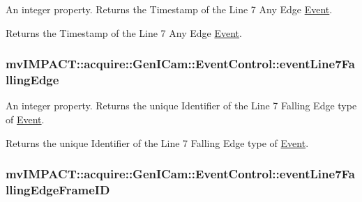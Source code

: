 An integer property. Returns the Timestamp of the Line 7 Any Edge \hyperlink{classmv_i_m_p_a_c_t_1_1acquire_1_1_event}{Event}. 

Returns the Timestamp of the Line 7 Any Edge \hyperlink{classmv_i_m_p_a_c_t_1_1acquire_1_1_event}{Event}. \hypertarget{classmv_i_m_p_a_c_t_1_1acquire_1_1_gen_i_cam_1_1_event_control_a3bbff631927ffcf9f32cb0161540f31b}{
\subsubsection[{event\+Line7\+Falling\+Edge}]{ mv\+I\+M\+P\+A\+C\+T\+::acquire\+::\+Gen\+I\+Cam\+::\+Event\+Control\+::event\+Line7\+Falling\+Edge}}\label{classmv_i_m_p_a_c_t_1_1acquire_1_1_gen_i_cam_1_1_event_control_a3bbff631927ffcf9f32cb0161540f31b}


An integer property. Returns the unique Identifier of the Line 7 Falling Edge type of \hyperlink{classmv_i_m_p_a_c_t_1_1acquire_1_1_event}{Event}. 

Returns the unique Identifier of the Line 7 Falling Edge type of \hyperlink{classmv_i_m_p_a_c_t_1_1acquire_1_1_event}{Event}. \hypertarget{classmv_i_m_p_a_c_t_1_1acquire_1_1_gen_i_cam_1_1_event_control_a5d7a2b38d2c86ed3896c44491b5925e1}{
\subsubsection[{event\+Line7\+Falling\+Edge\+Frame\+I\+D}]{ mv\+I\+M\+P\+A\+C\+T\+::acquire\+::\+Gen\+I\+Cam\+::\+Event\+Control\+::event\+Line7\+Falling\+Edge\+Frame\+I\+D}}\label{classmv_i_m_p_a_c_t_1_1acquire_1_1_gen_i_cam_1_1_event_control_a5d7a2b38d2c86ed3896c44491b5925e1}


